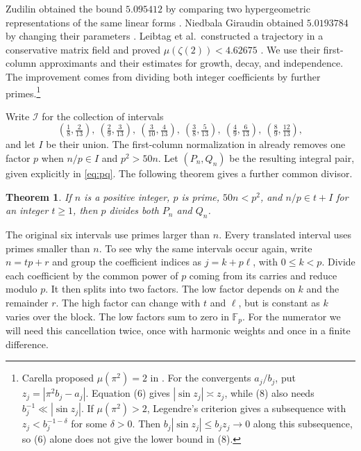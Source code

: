 \documentclass[11pt]{article}
\newtheorem{theorem}{Theorem}
\newcommand{\Fp}{\mathbb F_p}
\begin{document}
Zudilin obtained the bound $5.095412$ by comparing two hypergeometric
representations of the same linear forms \cite{Z}. Niedbala Giraudin
obtained $5.0193784$ by changing their parameters \cite{N}.
Leibtag et al.\ constructed a trajectory in a conservative matrix field
and proved $\mu(\zeta(2))<4.62675$ \cite{L}. We use their first-column
approximants and their estimates for growth, decay, and independence.
The improvement comes from dividing both integer coefficients by further
primes.\footnote{Carella proposed $\mu(\pi^2)=2$ in
\cite[Theorem 1.1]{C}. For the convergents $a_j/b_j$, put
$z_j=|\pi^2 b_j-a_j|$. Equation (6) gives $|\sin z_j|\asymp z_j$,
while (8) also needs $b_j^{-1}\ll |\sin z_j|$. If $\mu(\pi^2)>2$,
Legendre's criterion gives a subsequence with $z_j<b_j^{-1-\delta}$
for some $\delta>0$. Then $b_j|\sin z_j|\le b_jz_j\to0$ along this
subsequence, so (6) alone does not give the lower bound in (8).}

Write $\mathcal I$ for the collection of intervals
\begin{equation}\label{eq:intervals}
 \left(\tfrac18,\tfrac2{13}\right),\
 \left(\tfrac29,\tfrac3{13}\right),\
 \left(\tfrac3{10},\tfrac4{13}\right),\
 \left(\tfrac38,\tfrac5{13}\right),\
 \left(\tfrac49,\tfrac6{13}\right),\
 \left(\tfrac89,\tfrac{12}{13}\right),
\end{equation}
and let $I$ be their union. The first-column normalization in \cite{L}
already removes one factor $p$ when $n/p\in I$ and $p^2>50n$.
Let $(P_n,Q_n)$ be the resulting integral pair, given explicitly in
\eqref{eq:pq}. The following theorem gives a further common divisor.

\begin{theorem}\label{th:div}
If $n$ is a positive integer, $p$ is prime, $50n<p^2$, and
$n/p\in t+I$ for an integer $t\ge1$,
then $p$ divides both $P_n$ and $Q_n$.
\end{theorem}

The original six intervals use primes larger than $n$. Every translated
interval uses primes smaller than $n$. To see why the same intervals
occur again, write $n=tp+r$ and group the coefficient indices as
$j=k+p\ell$, with $0\le k<p$. Divide each coefficient by the common
power of $p$ coming from its carries and reduce modulo $p$. It then
splits into two factors. The low factor depends on $k$ and the
remainder $r$. The high factor can change with $t$ and $\ell$, but
is constant as $k$ varies over the block. The low factors sum to zero in
$\Fp$. For the numerator we will need this cancellation twice, once
with harmonic weights and once in a finite difference.
\end{document}

